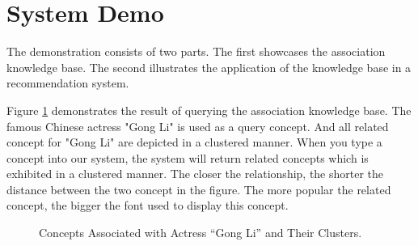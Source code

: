 \section{System Demo}

The demonstration consists of two parts. The first showcases the association
knowledge base. The second illustrates the application of
the knowledge base in a recommendation system.

Figure \ref{fig:gongli} demonstrates the result of querying the association knowledge base. The famous Chinese actress "Gong Li" is used as
a query concept. And all related concept for "Gong Li" are depicted in a clustered manner. When you type a concept into our system,
the system will return related concepts which is exhibited in a clustered manner. The closer the relationship, the shorter the distance between
the two concept in the figure. The more popular the related concept, the bigger the font used to display this concept.

\begin{figure}[th]
\centering
{}
\caption{Concepts Associated with Actress ``Gong Li'' and Their
Clusters.}
\label{fig:gongli}
\shrink
\end{figure}



